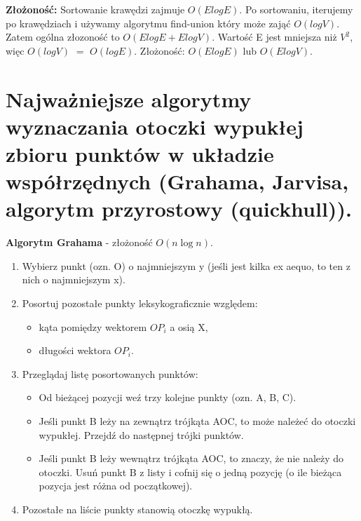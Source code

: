 \documentclass[main.tex]{subfiles}
\begin{document}
    \textbf{Złożoność:} Sortowanie krawędzi zajmuje $O(ElogE)$. Po sortowaniu, iterujemy po krawędziach i używamy algorytmu find-union który może zająć $O(logV)$. Zatem ogólna złozoność to $O(ElogE+ElogV)$. Wartość E jest mniejsza niż $V^2$, więc $O(logV)$ $=$ $O(logE)$. Złożoność: $O(ElogE)$ lub $O(ElogV)$.

    \newpage

    \section{Najważniejsze algorytmy wyznaczania otoczki wypukłej zbioru punktów w układzie współrzędnych (Grahama, Jarvisa, algorytm przyrostowy (quickhull)).}

    \begin{definition}
        \textbf{Algorytm Grahama} - złożoność $O(n \log n)$.
        \begin{enumerate}
            \item Wybierz punkt (ozn. O) o najmniejszym y (jeśli jest kilka ex aequo, to ten z nich o najmniejszym x).
            \item Posortuj pozostałe punkty leksykograficznie względem:
            \begin{itemize}
                \item kąta pomiędzy wektorem $OP_i$ a osią X,
                \item długości wektora $OP_i$.
            \end{itemize}
            \item Przeglądaj listę posortowanych punktów:
            \begin{itemize}
                \item Od bieżącej pozycji weź trzy kolejne punkty (ozn. A, B, C).
                \item Jeśli punkt B leży na zewnątrz trójkąta AOC, to może należeć do otoczki wypukłej. Przejdź do następnej trójki punktów.
                \item Jeśli punkt B leży wewnątrz trójkąta AOC, to znaczy, że nie należy do otoczki. Usuń punkt B z listy i cofnij się o jedną pozycję (o ile bieżąca pozycja jest różna od początkowej).
            \end{itemize}
            \item Pozostałe na liście punkty stanowią otoczkę wypukłą.
        \end{enumerate}
    \end{definition}
\end{document}
